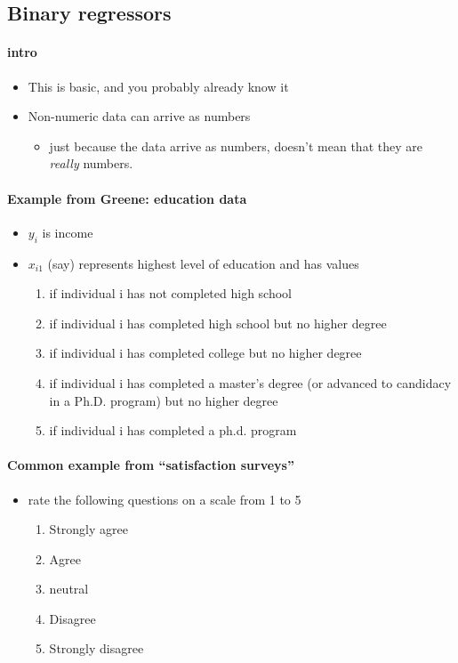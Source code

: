 \subsection{Binary regressors}

\paragraph{intro}
\begin{itemize}
\item This is basic, and you probably already know it
\item Non-numeric data can arrive as numbers
\begin{itemize}
\item just because the data arrive as numbers, doesn't mean that
          they are \emph{really} numbers.
\end{itemize}
\end{itemize}

\paragraph{Example from Greene: education data}
\begin{itemize}
\item $y_i$ is income
\item $x_{i1}$ (say) represents highest level of education and has
          values
\begin{enumerate}
\item if individual i has not completed high school
\item if individual i has completed high school but no higher
             degree
\item if individual i has completed college but no higher
             degree
\item if individual i has completed a master's degree (or
             advanced to candidacy in a Ph.D. program) but no higher
             degree
\item if individual i has completed a ph.d. program
\end{enumerate}
\end{itemize}

\paragraph{Common example from ``satisfaction surveys''}
\begin{itemize}
\item rate the following questions on a scale from 1 to 5
\begin{enumerate}
\item Strongly agree
\item Agree
\item neutral
\item Disagree
\item Strongly disagree
\end{enumerate}
\end{itemize}

